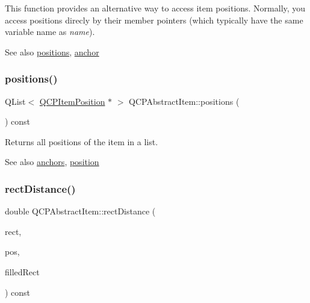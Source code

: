 This function provides an alternative way to access item positions. Normally, you access positions direcly by their member pointers (which typically have the same variable name as {\itshape name}).

\begin{DoxySeeAlso}{See also}
\mbox{\hyperlink{class_q_c_p_abstract_item_a709f655ac3f7f22d452714134662b454}{positions}}, \mbox{\hyperlink{class_q_c_p_abstract_item_a139c255ea8831642fac91748e29a5adb}{anchor}} 
\end{DoxySeeAlso}
\mbox{\label{class_q_c_p_abstract_item_a709f655ac3f7f22d452714134662b454}} 
\subsubsection{\texorpdfstring{positions()}{positions()}}
{\footnotesize\ttfamily Q\+List$<$ \mbox{\hyperlink{class_q_c_p_item_position}{Q\+C\+P\+Item\+Position}} $\ast$ $>$ Q\+C\+P\+Abstract\+Item\+::positions (\begin{DoxyParamCaption}{ }\end{DoxyParamCaption}) const\hspace{0.3cm}{\ttfamily [inline]}}

Returns all positions of the item in a list.

\begin{DoxySeeAlso}{See also}
\mbox{\hyperlink{class_q_c_p_abstract_item_a81d1ecfea3368b836cf9675a0045e659}{anchors}}, \mbox{\hyperlink{class_q_c_p_abstract_item_a2589c3d298f9a576d77d9addb440a18d}{position}} 
\end{DoxySeeAlso}
\mbox{\label{class_q_c_p_abstract_item_a7dfc2007e36d09b8b5c988a9f06d6a7e}} 
\subsubsection{\texorpdfstring{rectDistance()}{rectDistance()}}
{\footnotesize\ttfamily double Q\+C\+P\+Abstract\+Item\+::rect\+Distance (\begin{DoxyParamCaption}\item[{const Q\+RectF \&}]{rect,  }\item[{const Q\+PointF \&}]{pos,  }\item[{bool}]{filled\+Rect }\end{DoxyParamCaption}) const\hspace{0.3cm}{\ttfamily [protected]}}

